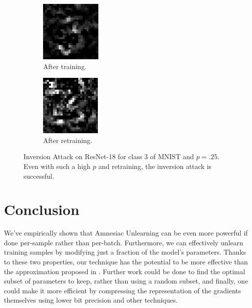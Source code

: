 \documentclass{article}
\begin{document}
\begin{figure}
    \centering
    \begin{subfigure}[b]{0.23\textwidth}
        \centering
        \includegraphics[width=.48\textwidth]{trained_single.png}
        \caption{After training.}
    \end{subfigure}%
    \begin{subfigure}[b]{0.23\textwidth}
        \centering
        \includegraphics[width=.48\textwidth]{retrained_single.png}
        \caption{After retraining.}
    \end{subfigure}
    \caption{Inversion Attack on ResNet-18 for class $3$ of MNIST and $p=.25$. Even with such a high $p$ and retraining, the inversion attack is successful.}
    \label{fig:inversion}
\end{figure}

\section{Conclusion}
We've empirically shown that Amnesiac Unlearning can be even more powerful if done per-sample rather than per-batch. Furthermore, we can effectively unlearn training samples by modifying just a fraction of the model's parameters. Thanks to these two properties, our technique has the potential to be more effective than the approximation proposed in \cite{gogineni2024efficient}. Further work could be done to find the optimal subset of parameters to keep, rather than using a random subset, and finally, one could make it more efficient by compressing the representation of the gradients themselves using lower bit precision and other techniques.



\end{document}
